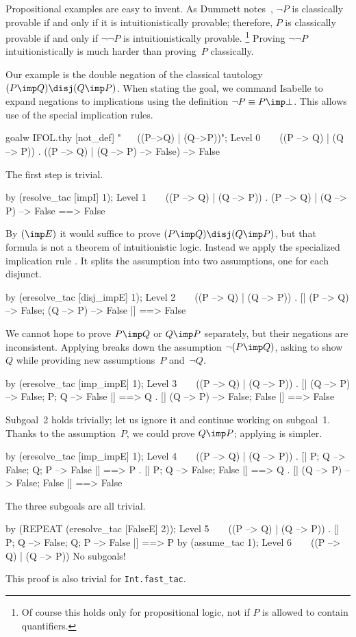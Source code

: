 Propositional examples are easy to invent.  As Dummett notes~\cite[page
28]{dummett}, $\neg P$ is classically provable if and only if it is
intuitionistically provable;  therefore, $P$ is classically provable if and
only if $\neg\neg P$ is intuitionistically provable.%
\footnote{Of course this holds only for propositional logic, not if $P$ is
  allowed to contain quantifiers.} Proving $\neg\neg P$ intuitionistically is
much harder than proving~$P$ classically.

Our example is the double negation of the classical tautology $(P\imp
Q)\disj (Q\imp P)$.  When stating the goal, we command Isabelle to expand
negations to implications using the definition $\neg P\equiv P\imp\bot$.
This allows use of the special implication rules.
\begin{ttbox}
goalw IFOL.thy [not_def] "~ ~ ((P-->Q) | (Q-->P))";
{\out Level 0}
{\out ~ ~ ((P --> Q) | (Q --> P))}
{. ((P --> Q) | (Q --> P) --> False) --> False}
\end{ttbox}
The first step is trivial.
\begin{ttbox}
by (resolve_tac [impI] 1);
{\out Level 1}
{\out ~ ~ ((P --> Q) | (Q --> P))}
{. (P --> Q) | (Q --> P) --> False ==> False}
\end{ttbox}
By $(\imp E)$ it would suffice to prove $(P\imp Q)\disj (Q\imp P)$, but
that formula is not a theorem of intuitionistic logic.  Instead we apply
the specialized implication rule .  It splits the
assumption into two assumptions, one for each disjunct.
\begin{ttbox}
by (eresolve_tac [disj_impE] 1);
{\out Level 2}
{\out ~ ~ ((P --> Q) | (Q --> P))}
{. [| (P --> Q) --> False; (Q --> P) --> False |] ==> False}
\end{ttbox}
We cannot hope to prove $P\imp Q$ or $Q\imp P$ separately, but
their negations are inconsistent.  Applying  breaks down
the assumption $\neg(P\imp Q)$, asking to show~$Q$ while providing new
assumptions~$P$ and~$\neg Q$.
\begin{ttbox}
by (eresolve_tac [imp_impE] 1);
{\out Level 3}
{\out ~ ~ ((P --> Q) | (Q --> P))}
{. [| (Q --> P) --> False; P; Q --> False |] ==> Q}
{. [| (Q --> P) --> False; False |] ==> False}
\end{ttbox}
Subgoal~2 holds trivially; let us ignore it and continue working on
subgoal~1.  Thanks to the assumption~$P$, we could prove $Q\imp P$;
applying  is simpler.
\begin{ttbox}
by (eresolve_tac [imp_impE] 1);
{\out Level 4}
{\out ~ ~ ((P --> Q) | (Q --> P))}
{. [| P; Q --> False; Q; P --> False |] ==> P}
{. [| P; Q --> False; False |] ==> Q}
{. [| (Q --> P) --> False; False |] ==> False}
\end{ttbox}
The three subgoals are all trivial.
\begin{ttbox}
by (REPEAT (eresolve_tac [FalseE] 2));
{\out Level 5}
{\out ~ ~ ((P --> Q) | (Q --> P))}
{. [| P; Q --> False; Q; P --> False |] ==> P}
\ttbreak
by (assume_tac 1);
{\out Level 6}
{\out ~ ~ ((P --> Q) | (Q --> P))}
{\out No subgoals!}
\end{ttbox}
This proof is also trivial for {\tt Int.fast_tac}.


